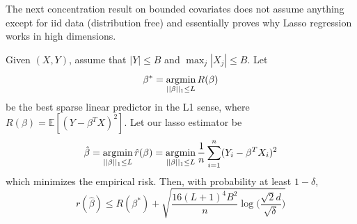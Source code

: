   The next concentration result on bounded covariates does not assume anything except for iid data (distribution free) and essentially proves why Lasso regression works in high dimensions. 

  \begin{theorem}
    Given $(X, Y)$, assume that $|Y| \leq B$ and $\max_j |X_j| \leq B$. Let 
    \begin{equation}
      \beta^\ast = \operatorname*{\arg\!\min}_{||\beta||_1 \leq L} R(\beta)
    \end{equation}
    be the best sparse linear predictor in the L1 sense, where $R(\beta) = \mathbb{E}[ (Y - \beta^T X)^2]$. Let our lasso estimator be 
    \begin{equation}
      \hat{\beta} = \operatorname*{\arg\!\min}_{||\beta||_1 \leq L} \hat{r}(\beta) = \operatorname*{\arg\!\min}_{||\beta||_1 \leq L} \frac{1}{n} \sum_{i=1}^n (Y_i - \beta^T X_i)^2
    \end{equation}
    which minimizes the empirical risk. Then, with probability at least $1 - \delta$, 
    \begin{equation}
      r(\hat{\beta}) \leq R(\beta^\ast) + \sqrt{\frac{16(L+1)^4 B^2}{n} \log \bigg( \frac{\sqrt{2} d}{\sqrt{\delta}} \bigg)} 
    \end{equation}
  \end{theorem}

